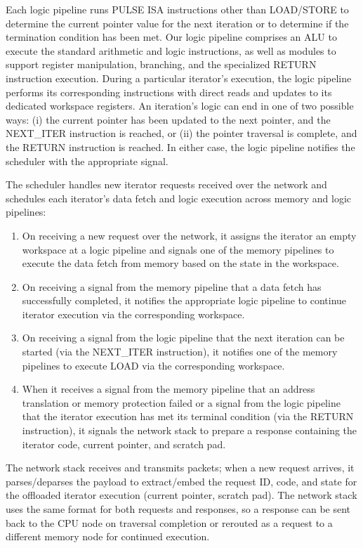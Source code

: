  Each logic pipeline runs PULSE ISA instructions other than LOAD/STORE to determine the current pointer value for the next iteration or to determine if the termination condition has been met. Our logic pipeline comprises an ALU to execute the standard arithmetic and logic instructions, as well as modules to support register manipulation, branching, and the specialized RETURN instruction execution. During a particular iterator's execution, the logic pipeline performs its corresponding instructions with direct reads and updates to its dedicated workspace registers. An iteration's logic can end in one of two possible ways: (i) the current pointer has been updated to the next pointer, and the NEXT\_ITER instruction is reached, or (ii) the pointer traversal is complete, and the RETURN instruction is reached. In either case, the logic pipeline notifies the scheduler with the appropriate signal.

 The scheduler handles new iterator requests received over the network and schedules each iterator's data fetch and logic execution across memory and logic pipelines: \begin{enumerate}[leftmargin=*, itemsep=0pt] \item On receiving a new request over the network, it assigns the iterator an empty workspace at a logic pipeline and signals one of the memory pipelines to execute the data fetch from memory based on the state in the workspace. \item On receiving a signal from the memory pipeline that a data fetch has successfully completed, it notifies the appropriate logic pipeline to continue iterator execution via the corresponding workspace. \item On receiving a signal from the logic pipeline that the next iteration can be started (via the NEXT\_ITER instruction), it notifies one of the memory pipelines to execute LOAD via the corresponding workspace. \item When it receives a signal from the memory pipeline that an address translation or memory protection failed or a signal from the logic pipeline that the iterator execution has met its terminal condition (via the RETURN instruction), it signals the network stack to prepare a response containing the iterator code, current pointer, and scratch pad. \end{enumerate}

 The network stack receives and transmits packets; when a new request arrives, it parses/deparses the payload to extract/embed the request ID, code, and state for the offloaded iterator execution (current pointer, scratch pad). The network stack uses the same format for both requests and responses, so a response can be sent back to the CPU node on traversal completion or rerouted as a request to a different memory node for continued execution.

